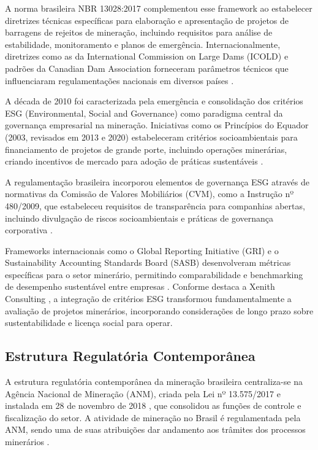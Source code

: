 A norma brasileira NBR 13028:2017 complementou esse framework ao estabelecer diretrizes técnicas específicas para elaboração e apresentação de projetos de barragens de rejeitos de mineração, incluindo requisitos para análise de estabilidade, monitoramento e planos de emergência. Internacionalmente, diretrizes como as da International Commission on Large Dams (ICOLD) e padrões da Canadian Dam Association forneceram parâmetros técnicos que influenciaram regulamentações nacionais em diversos países \cite{icold2001tailings, cda2007guidelines}.

A década de 2010 foi caracterizada pela emergência e consolidação dos critérios ESG (Environmental, Social and Governance) como paradigma central da governança empresarial na mineração. Iniciativas como os Princípios do Equador (2003, revisados em 2013 e 2020) estabeleceram critérios socioambientais para financiamento de projetos de grande porte, incluindo operações minerárias, criando incentivos de mercado para adoção de práticas sustentáveis \cite{equator2020principles}.

A regulamentação brasileira incorporou elementos de governança ESG através de normativas da Comissão de Valores Mobiliários (CVM), como a Instrução nº 480/2009, que estabeleceu requisitos de transparência para companhias abertas, incluindo divulgação de riscos socioambientais e práticas de governança corporativa \cite{cvm2009instrucao480}.

Frameworks internacionais como o Global Reporting Initiative (GRI) e o Sustainability Accounting Standards Board (SASB) desenvolveram métricas específicas para o setor minerário, permitindo comparabilidade e benchmarking de desempenho sustentável entre empresas \cite{gri2013mining, sasb2018sustainability}. Conforme destaca a Xenith Consulting \cite{xenith2025esg}, a integração de critérios ESG transformou fundamentalmente a avaliação de projetos minerários, incorporando considerações de longo prazo sobre sustentabilidade e licença social para operar.

\subsection{Estrutura Regulatória Contemporânea}

A estrutura regulatória contemporânea da mineração brasileira centraliza-se na Agência Nacional de Mineração (ANM), criada pela Lei nº 13.575/2017 e instalada em 28 de novembro de 2018 \cite{brasil2017senado}, que consolidou as funções de controle e fiscalização do setor. A atividade de mineração no Brasil é regulamentada pela ANM, sendo uma de suas atribuições dar andamento aos trâmites dos processos minerários \cite{jazida2022leis}.

